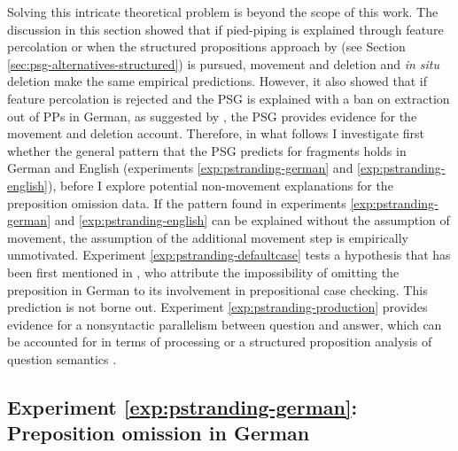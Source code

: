 Solving this intricate theoretical problem is beyond the scope of this work. The discussion in this section showed that if pied-piping is explained through feature percolation or when the structured propositions approach by \citet{reich2002} (see Section \ref{sec:psg-alternatives-structured}) is pursued, movement and deletion and \textit{in situ} deletion make the same empirical predictions. However, it also showed that if feature percolation is rejected and the PSG is explained with a ban on extraction out of PPs in German, as suggested by \citet{abels2003, abels2012}, the PSG provides evidence for the movement and deletion account. Therefore, in what follows I investigate first whether the general pattern that the PSG predicts for fragments holds in German and English (experiments \ref{exp:pstranding-german} and \ref{exp:pstranding-english}), before I explore potential non-movement explanations for the preposition omission data. If the pattern found in experiments \ref{exp:pstranding-german} and \ref{exp:pstranding-english} can be explained without the assumption of movement, the assumption of the additional movement step is empirically unmotivated. Experiment \ref{exp:pstranding-defaultcase} tests a hypothesis that has been first mentioned in \citet{barton.progovac2005}, who attribute the impossibility of omitting the preposition in German to its involvement in prepositional case checking. This prediction is not borne out. Experiment \ref{exp:pstranding-production} provides evidence for a nonsyntactic parallelism between question and answer, which can be accounted for in terms of processing \citep{levelt.kelter1982, nykiel2017} or a structured proposition analysis of question semantics \citep{reich2002, reich2007}.


\label{exp:pstranding-german}
\subsection{Experiment \ref{exp:pstranding-german}: Preposition omission in German} 
\label{sec:pstranding-german}


